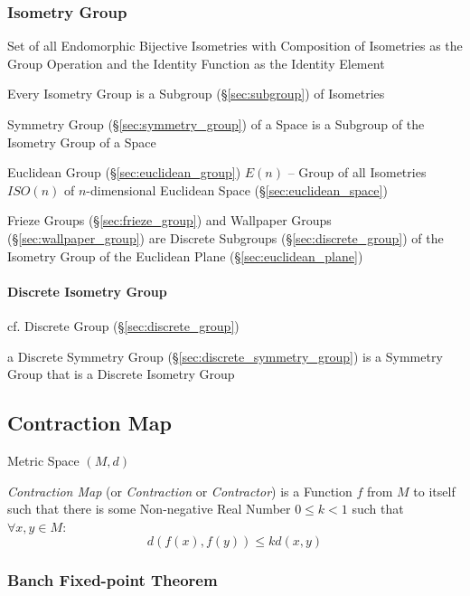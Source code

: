 \subsubsection{Isometry Group}\label{sec:isometry_group}

Set of all Endomorphic Bijective Isometries with Composition of
Isometries as the Group Operation and the Identity Function as the
Identity Element

Every Isometry Group is a Subgroup (\S\ref{sec:subgroup}) of Isometries

Symmetry Group (\S\ref{sec:symmetry_group}) of a Space is a Subgroup
of the Isometry Group of a Space

Euclidean Group (\S\ref{sec:euclidean_group}) $E(n)$ -- Group of all
Isometries $ISO(n)$ of $n$-dimensional Euclidean Space
(\S\ref{sec:euclidean_space})

Frieze Groups (\S\ref{sec:frieze_group}) and Wallpaper Groups
(\S\ref{sec:wallpaper_group}) are Discrete Subgroups
(\S\ref{sec:discrete_group}) of the Isometry Group of the Euclidean Plane
(\S\ref{sec:euclidean_plane})



\paragraph{Discrete Isometry Group}\label{sec:discrete_isometry_group}\hfill

cf. Discrete Group (\S\ref{sec:discrete_group})

a Discrete Symmetry Group (\S\ref{sec:discrete_symmetry_group}) is a Symmetry
Group that is a Discrete Isometry Group



\subsection{Contraction Map}\label{sec:contraction_map}

Metric Space $(M,d)$

\emph{Contraction Map} (or \emph{Contraction} or \emph{Contractor}) is
a Function $f$ from $M$ to itself such that there is some Non-negative
Real Number $0 \leq k < 1$ such that $\forall x,y \in M$:
\[
  d(f(x),f(y)) \leq k d(x,y)
\]



\subsubsection{Banch Fixed-point Theorem}\label{sec:banach_fixedpoint}

